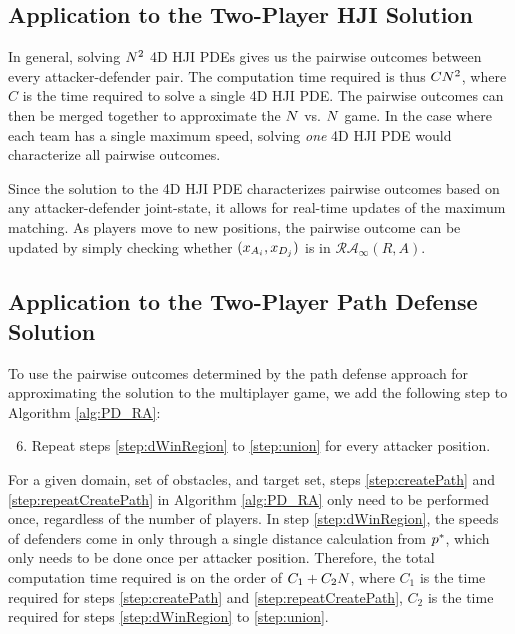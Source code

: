 \subsection{Application to the Two-Player HJI Solution}
\label{subusec:MMHJI}
In general, solving $N^2$ 4D HJI PDEs gives us the pairwise outcomes between every attacker-defender pair. The computation time required is thus $C N^2$, where $C$ is the time required to solve a single 4D HJI PDE. The pairwise outcomes can then be merged together to approximate the $N$ vs. $N$ game. In the case where each team has a single maximum speed, solving \textit{one} 4D HJI PDE would characterize all pairwise outcomes.

Since the solution to the 4D HJI PDE characterizes pairwise outcomes based on any attacker-defender joint-state, it allows for real-time updates of the maximum matching. As players move to new positions, the pairwise outcome can be updated by simply checking whether $(x_{A_{i}}, x_{D_{j}})$ is in $\mathcal{RA}_\infty(R,A)$.

\subsection{Application to the Two-Player Path Defense Solution}
\label{subsec:MMPD}
To use the pairwise outcomes determined by the path defense approach for approximating the solution to the multiplayer game, we add the following step to Algorithm \ref{alg:PD_RA}: 
\begin{enumerate}
\setcounter{enumi}{5}
\item Repeat steps \ref{step:dWinRegion} to \ref{step:union} for every attacker position.
\end{enumerate}

For a given domain, set of obstacles, and target set, steps \ref{step:createPath} and \ref{step:repeatCreatePath} in Algorithm \ref{alg:PD_RA} only need to be performed once, regardless of the number of players. In step \ref{step:dWinRegion}, the speeds of defenders come in only through a single distance calculation from $p^*$, which only needs to be done once per attacker position. Therefore, the total computation time required is on the order of $C_1 + C_2 N$, where $C_1$ is the time required for steps \ref{step:createPath} and \ref{step:repeatCreatePath}, $C_2$ is the time required for steps \ref{step:dWinRegion} to \ref{step:union}. 
